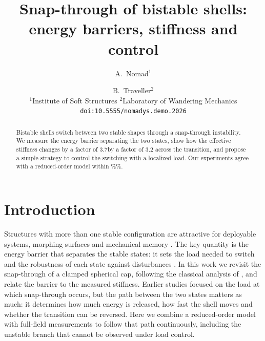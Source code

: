 \documentclass[10pt,twocolumn]{article}
\title{\bfseries Snap-through of bistable shells:\\ energy barriers, stiffness and control}
\author{A.~Nomad$^{1}$ \and B.~Traveller$^{2}$\\[2pt]
\small $^1$Institute of Soft Structures \quad $^2$Laboratory of Wandering Mechanics\\
\small \texttt{doi:10.5555/nomadys.demo.2026}}
\date{}
\newcommand{\rev}[2]{\ifdefined\revised #2\else #1\fi}
\begin{document}
\maketitle
\begin{abstract}
Bistable shells switch between two stable shapes through a snap-through
instability. We measure the energy barrier separating the two states, show
how the effective stiffness changes \rev{by a factor of 3.2}{by a factor of 3.7}
across the transition, and propose a simple strategy to control the switching
with a localized load. Our experiments agree with a reduced-order model within
\rev{8\%}{5\%}.
\end{abstract}

\section{Introduction}
Structures with more than one stable configuration are attractive for
deployable systems, morphing surfaces and mechanical memory
\cite{hu2015,holmes2019}. The key quantity is the energy barrier that separates
the stable states: it sets the load needed to switch and the robustness of each
state against disturbances \cite{gomez2017}. In this work we revisit the
snap-through of a clamped spherical cap, following the classical analysis of
\cite{koiter1945}, and relate the barrier to the measured stiffness.
Earlier studies focused on the load at which snap-through occurs, but the path between the two states matters as much: it determines how much energy is released, how fast the shell moves and whether the transition can be reversed. Here we combine a reduced-order model with full-field measurements to follow that path continuously, including the unstable branch that cannot be observed under load control.
\end{document}
